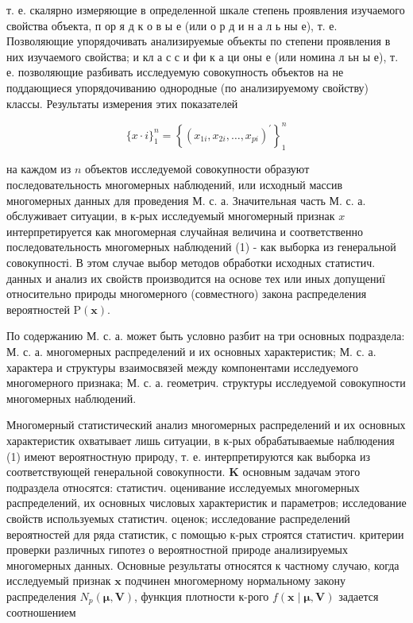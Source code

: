 \documentclass[10pt]{article}
\begin{document}
т. е. скалярно измеряющие в определенной шкале степень проявления изучаемого свойства объекта, п ор я д к о в ы е (или о р д и н а л ь ны е), т. е. Позволяющие упорядочивать анализируемые объекты по степени проявления в них изучаемого свойства; и кл а с с и фи к а ци оны е (или номина л ьн ы е), т. е. позволяющие разбивать исследуемую совокупность объектов на не поддающиеся упорядочиванию однородные (по анализируемому свойству) классы. Результаты измерения этих показателей



\[

\{x \cdot i\}_{1}^{n}=\left\{\left(x_{1 i}, x_{2 i}, \ldots, x_{p i}\right)^{\prime}\right\}_{1}^{n}

\]



на каждом из $n$ объектов исследуемой совокупности образуют последовательность многомерных наблюдений, или исходный массив многомерных данных для проведения М. с. а. Значительная часть М. с. а. обслуживает ситуации, в к-рых исследуемый многомерный признак $x$ интерпретируется как многомерная случайная величина и соответственно последовательность многомерных наблюдений (1) - как выборка из генеральной совокупності. В этом случае выбор методов обработки исходных статистич. данных и анализ их свойств производится на основе тех или иных допущениї относительно природы многомерного (совместного) закона распределения вероятностей $\mathrm{P}(\boldsymbol{x})$.



По содержанию М. с. а. может быть условно разбит на три основных подраздела: М. с. а. многомерных распределений и их основных характеристик; М. с. а. характера и структуры взаимосвязей между компонентами исследуемого многомерного признака; М. с. а. геометрич. структуры исследуемой совокупности многомерных наблюдений.



Многомерный статистический анализ многомерных распределений и их основных характеристик охватывает лишь ситуации, в к-рых обрабатываемые наблюдения (1) имеют вероятностную природу, т. е. интерпретируются как выборка из соответствующей генеральной совокупности. $\mathbf{K}$ основным задачам этого подраздела относятся: статистич. оценивание исследуемых многомерных распределений, их основных числовых характеристик и параметров; исследование свойств используемых статистич. оценок; исследование распределений вероятностей для ряда статистик, с помощью к-рых строятся статистич. критерии проверки различных гипотез о вероятностной природе анализируемых многомерных данных. Основные результаты относятся к частному случаю, когда исследуемый признак $\boldsymbol{x}$ подчинен многомерному нормальному закону распределения $N_{p}(\boldsymbol{\mu}, \boldsymbol{V})$, функция плотности к-рого $f(\boldsymbol{x} \mid \boldsymbol{\mu}, \boldsymbol{V})$ задается соотношением
\end{document}
